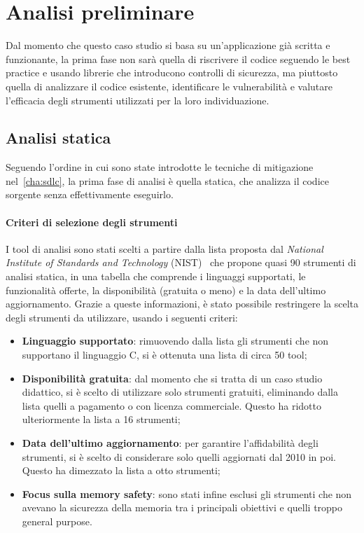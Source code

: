 \section{Analisi preliminare}
\label{sec:initial_analysis}

Dal momento che questo caso studio si basa su un'applicazione già scritta e funzionante,
la prima fase non sarà quella di riscrivere il codice seguendo le best practice
e usando librerie che introducono controlli di sicurezza, ma piuttosto quella di
analizzare il codice esistente, identificare le vulnerabilità e valutare l'efficacia
degli strumenti utilizzati per la loro individuazione.

\subsection*{Analisi statica}
Seguendo l'ordine in cui sono state introdotte le tecniche di mitigazione nel~\autoref{cha:sdlc},
la prima fase di analisi è quella statica, che analizza il codice sorgente senza
effettivamente eseguirlo.

\paragraph{Criteri di selezione degli strumenti}
I tool di analisi sono stati scelti a partire dalla lista proposta dal \textit{National
Institute of Standards and Technology} (NIST)~\cite{nist_sast_list} che propone
quasi 90 strumenti di analisi statica, in una tabella che comprende i linguaggi supportati,
le funzionalità offerte, la disponibilità (gratuita o meno) e la data dell'ultimo
aggiornamento. Grazie a queste informazioni, è stato possibile restringere la scelta
degli strumenti da utilizzare, usando i seguenti criteri:
\begin{itemize}
  \item \textbf{Linguaggio supportato}: rimuovendo dalla lista gli strumenti che
    non supportano il linguaggio C, si è ottenuta una lista di circa 50 tool;

  \item \textbf{Disponibilità gratuita}: dal momento che si tratta di un caso studio
    didattico, si è scelto di utilizzare solo strumenti gratuiti, eliminando dalla
    lista quelli a pagamento o con licenza commerciale. Questo ha ridotto
    ulteriormente la lista a 16 strumenti;

  \item \textbf{Data dell'ultimo aggiornamento}: per garantire l'affidabilità degli
    strumenti, si è scelto di considerare solo quelli aggiornati dal 2010 in poi.
    Questo ha dimezzato la lista a otto strumenti;

  \item \textbf{Focus sulla memory safety}: sono stati infine esclusi gli strumenti
    che non avevano la sicurezza della memoria tra i principali obiettivi e quelli
    troppo general purpose.
\end{itemize}

